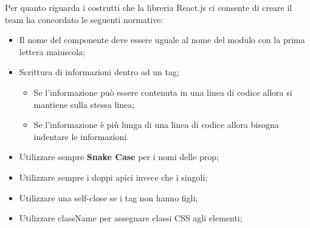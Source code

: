 Per quanto riguarda i costrutti che la libreria React.js ci consente di creare il team ha concordato le seguenti normative:
\begin{itemize}
    \item Il nome del componente deve essere uguale al nome del modulo con la prima lettera maiuscola;
    \item Scrittura di informazioni dentro ad un tag;
    \begin{itemize}
        \item Se l’informazione può essere contenuta in una linea di codice allora si mantiene sulla stessa
        linea;
        \item Se l’informazione è più lunga di una linea di codice allora bisogna indentare le informazioni.
    \end{itemize}
    \item Utilizzare sempre \textbf{Snake Case} per i nomi delle prop;
    \item Utilizzare sempre i doppi apici invece che i singoli;
    \item Utilizzare una self-close se i tag non hanno figli;
    \item Utilizzare className per assegnare classi CSS agli elementi;
\end{itemize}


